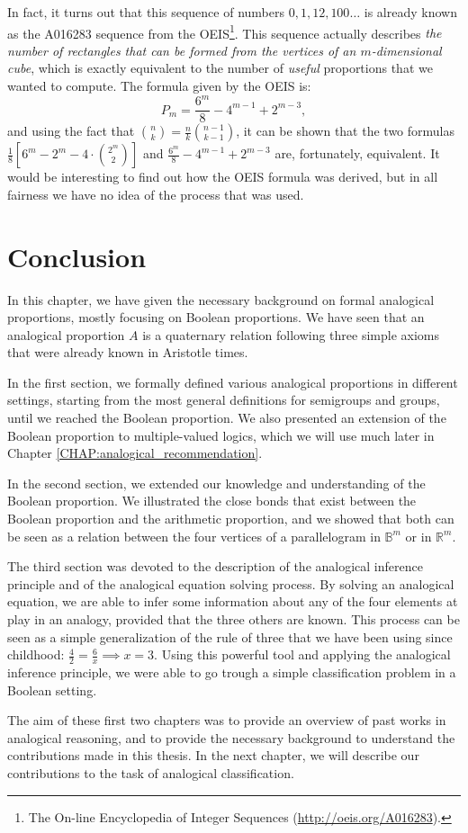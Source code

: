 In fact, it turns out that this sequence of numbers $0, 1, 12, 100\dots$ is
already known as the A016283 sequence from the OEIS\footnote{The On-line
Encyclopedia of Integer Sequences (\url{http://oeis.org/A016283}).}.
This sequence actually describes \textit{the number of rectangles that can be
formed from the vertices of an $m$-dimensional cube}, which is exactly
equivalent to the number of \textit{useful} proportions that we wanted to
compute. The formula given by the OEIS is:
$$P_m = \frac{6^m}{8} - 4^{m - 1} + 2^{m - 3},$$
and using the fact that $\binom{n}{k} = \frac{n}{k}\binom{n - 1}{k - 1}$, it
can be shown that the two formulas $\frac{1}{8} \left[6^m - 2^m -
4\cdot\binom{2^m}{2} \right]$ and $\frac{6^m}{8} - 4^{m - 1} + 2^{m- 3}$ are,
fortunately, equivalent. It would be interesting to find out how the OEIS
formula was derived, but in all fairness we have no idea of the process that
was used.

\section*{Conclusion}

In this chapter, we have given the necessary background on formal analogical
proportions, mostly focusing on Boolean proportions. We have seen that an
analogical proportion $A$ is a quaternary relation following three simple
axioms that were already known in Aristotle times.

In the first section, we formally defined various analogical proportions in different settings,
starting from the most general definitions for semigroups and groups, until we
reached the Boolean proportion. We also presented an extension of the Boolean
proportion to multiple-valued logics, which we will use much later in Chapter
\ref{CHAP:analogical_recommendation}.

In the second section, we extended our knowledge and understanding of the Boolean
proportion. We illustrated the close bonds that exist between the Boolean
proportion and the arithmetic proportion, and we showed that both can be seen
as a relation between the four vertices of a parallelogram in $\mathbb{B}^m$ or
in $\mathbb{R}^m$.

The third section was devoted to the description of the analogical inference
principle and of the analogical equation solving process. By solving an
analogical equation, we are able to infer some information about any of the
four elements at play in an analogy, provided that the three others are known.
This process can be seen as a simple generalization of the rule of three that
we have been using since childhood: $\frac{4}{2} = \frac{6}{x} \implies x =
3$. Using this powerful tool and applying the analogical inference principle,
we were able to go trough a simple classification problem in a Boolean setting.

The aim of these first two chapters was to provide an overview of past works in
analogical reasoning, and to provide the necessary background to understand the
contributions made in this thesis. In the next chapter, we will describe our
contributions to the task of analogical classification.
